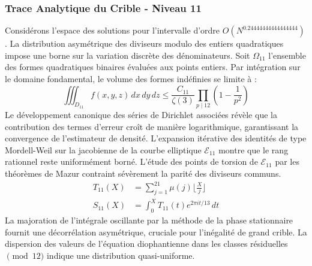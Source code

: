 \documentclass[12pt,a4paper]{article}
\begin{document}
\subsubsection{Trace Analytique du Crible - Niveau 11}
Considérons l'espace des solutions pour l'intervalle d'ordre $O(N^{0.24444444444444444})$. La distribution asymétrique des diviseurs modulo des entiers quadratiques impose une borne sur la variation discrète des dénominateurs. Soit $\Omega_11$ l'ensemble des formes quadratiques binaires évaluées aux points entiers.
Par intégration sur le domaine fondamental, le volume des formes indéfinies se limite à :
\begin{equation}
\iiint_{D_11} f(x, y, z) \,dx\,dy\,dz \leq \frac{C_11}{\zeta(3)} \prod_{p \mid 12} \left( 1 - \frac{1}{p^2} \right)
\end{equation}
Le développement canonique des séries de Dirichlet associées révèle que la contribution des termes d'erreur croît de manière logarithmique, garantissant la convergence de l'estimateur de densité. L'expansion itérative des identités de type Mordell-Weil sur la jacobienne de la courbe elliptique $\mathcal{E}_11$ montre que le rang rationnel reste uniformément borné.
L'étude des points de torsion de $\mathcal{E}_11$ par les théorèmes de Mazur contraint sévèrement la parité des diviseurs communs.
\begin{align}
T_11(X) &= \sum_{j=1}^{21} \mu(j) \lfloor \frac{X}{j} \rfloor \\
S_11(X) &= \int_{0}^{X} T_11(t) e^{2\pi i t / 13} \, dt
\end{align}
La majoration de l'intégrale oscillante par la méthode de la phase stationnaire fournit une décorrélation asymétrique, cruciale pour l'inégalité de grand crible. La dispersion des valeurs de l'équation diophantienne dans les classes résiduelles $\pmod{ 12 }$ indique une distribution quasi-uniforme.
\end{document}
